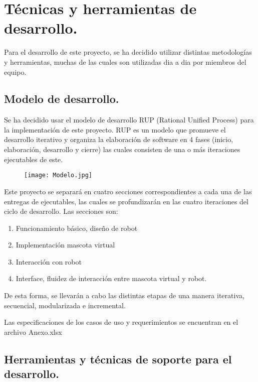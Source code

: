 \section{T\'ecnicas y herramientas de desarrollo.}
Para el desarrollo de este proyecto, se ha decidido utilizar distintas metodolog\'ias y herramientas, muchas de las cuales son utilizadas dia a dia por miembros del equipo. 

\subsection{Modelo de desarrollo.}

Se ha decidido usar el modelo de desarrollo RUP (Rational Unified Process) para la implementaci\'on de este proyecto. RUP es un modelo que promueve el desarrollo iterativo y organiza la elaboraci\'on de software en 4 fases (inicio, elaboraci\'on, desarrollo y cierre) las cuales consisten de una o m\'as iteraciones ejecutables de este. 

\begin{figure}[H]
  \centering
  \texttt{[image: Modelo.jpg]}
  \label{fig:RUP}
\end{figure}

Este proyecto se separar\'a en cuatro secciones correspondientes a cada una de las entregas de ejecutables, las cuales se profundizar\'an en las cuatro iteraciones del ciclo de desarrollo. Las secciones son:

\begin{enumerate}
\item Funcionamiento b\'asico, dise\~no de robot
\item Implementaci\'on mascota virtual
\item Interacci\'on con robot
\item Interface, fluidez de interacci\'on entre mascota virtual y robot.
\end{enumerate}

De esta forma, se llevar\'an a cabo las distintas etapas de una manera iterativa, secuencial, modularizada e incremental.

Las especificaciones de los casos de uso y requerimientos se encuentran en el archivo Anexo.xlsx

\subsection{Herramientas y t\'ecnicas de soporte para el desarrollo.}

